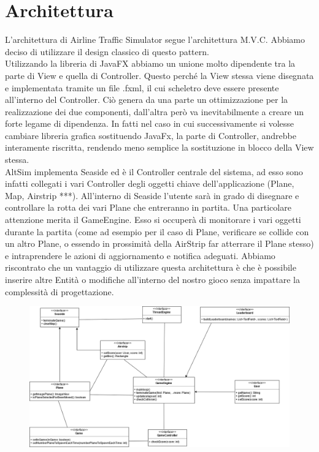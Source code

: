 \documentclass[a4paper,12pt]{report}
\begin{document}
\section{Architettura}
L’architettura di Airline Traffic Simulator segue l’architettura M.V.C. \newline
Abbiamo deciso di utilizzare il design classico di questo pattern.
\\
Utilizzando la libreria di JavaFX abbiamo un unione molto dipendente tra la parte di View e quella di Controller.
Questo perché la View stessa viene disegnata e implementata tramite un file .fxml, il cui scheletro deve essere presente all’interno del Controller.
Ciò genera da una parte un ottimizzazione per la realizzazione dei due componenti, dall’altra però va inevitabilmente a creare un forte legame di dipendenza.
In fatti nel caso in cui successivamente si volesse cambiare libreria grafica sostituendo JavaFx, la parte di Controller, andrebbe interamente riscritta, rendendo meno semplice la sostituzione in blocco della View stessa.
\\
AltSim implementa Seaside ed è il Controller centrale del sistema, ad esso sono infatti collegati i vari Controller degli oggetti chiave dell’applicazione (Plane, Map, Airstrip ***). 
All’interno di Seaside l’utente sarà in grado di disegnare e controllare la rotta dei vari Plane che entreranno in partita.
Una particolare attenzione merita il GameEngine.
Esso si occuperà di monitorare i vari oggetti durante la partita (come ad esempio per il caso di Plane, verificare se collide con un altro Plane, o essendo in prossimità della AirStrip far atterrare il Plane stesso) e intraprendere le azioni di aggiornamento e notifica adeguati. Abbiamo riscontrato che un vantaggio di utilizzare questa architettura è che è possibile inserire altre Entità o modifiche all’interno del nostro gioco senza impattare la complessità di progettazione.
\begin{figure}[H]
    \begin{center}
        \centering
        \includegraphics[width=\textwidth]{img/Design/Architettura.png}
    \end{center}
    \label{img:architettura}
\end{figure}
\end{document}
